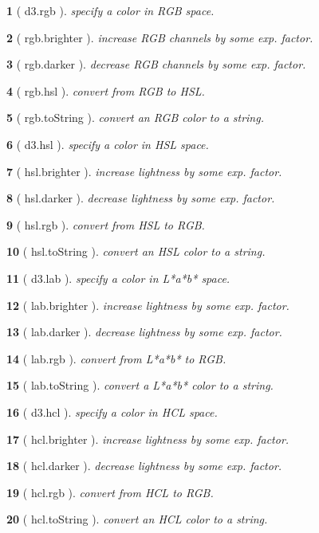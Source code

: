 \documentclass[10pt,landscape,letterpaper]{article}
\newcounter{thm}
\newcommand{\hdrule}{\vspace{-4pt} \hdashrule[0.25ex]{\fill}{.5pt}{1pt}\vspace{-4pt}}
\theoremstyle{mytheoremstyle}
\newtheorem*{thm}{}
\begin{document}
\begin{multicols}{3}
\begin{thm} [ d3.rgb ]  specify a color in RGB space.
\end{thm}\begin{thm} [ rgb.brighter ]  increase RGB channels by some exp. factor.
\end{thm}\begin{thm} [ rgb.darker ]  decrease RGB channels by some exp. factor.
\end{thm}\begin{thm} [ rgb.hsl ]  convert from RGB to HSL.
\end{thm}\begin{thm} [ rgb.toString ]  convert an RGB color to a string.
\end{thm}\begin{thm} [ d3.hsl ]  specify a color in HSL space.
\end{thm}\begin{thm} [ hsl.brighter ]  increase lightness by some exp. factor.
\end{thm}\begin{thm} [ hsl.darker ]  decrease lightness by some exp. factor.
\end{thm}\begin{thm} [ hsl.rgb ]  convert from HSL to RGB.
\end{thm}\begin{thm} [ hsl.toString ]  convert an HSL color to a string.
\end{thm}\begin{thm} [ d3.lab ]  specify a color in L*a*b* space.
\end{thm}\begin{thm} [ lab.brighter ]  increase lightness by some exp. factor.
\end{thm}\begin{thm} [ lab.darker ]  decrease lightness by some exp. factor.
\end{thm}\begin{thm} [ lab.rgb ]  convert from L*a*b* to RGB.
\end{thm}\begin{thm} [ lab.toString ]  convert a L*a*b* color to a string.
\end{thm}\begin{thm} [ d3.hcl ]  specify a color in HCL space.
\end{thm}\begin{thm} [ hcl.brighter ]  increase lightness by some exp. factor.
\end{thm}\begin{thm} [ hcl.darker ]  decrease lightness by some exp. factor.
\end{thm}\begin{thm} [ hcl.rgb ]  convert from HCL to RGB.
\end{thm}\begin{thm} [ hcl.toString ]  convert an HCL color to a string.\end{thm}
\hdrule

\end{multicols}
\end{document}
